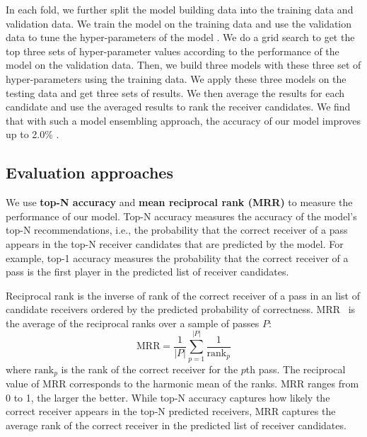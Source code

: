 In each fold, we further split the model building data into the training data and validation data.
We train the model on the training data and use the validation data to tune the hyper-parameters of the model .
We do a grid search to get the top three sets of hyper-parameter values according to the performance of the model on the validation data.
Then, we build three models with these three set of hyper-parameters using the training data. 
We apply these three models on the testing data and get three sets of results.
We then average the results for each candidate and use the averaged results to rank the receiver candidates. We find that with such a model ensembling approach, the accuracy of our model improves up to 2.0\% .




\subsection{Evaluation approaches}

We use \textbf{top-N accuracy} and \textbf{mean reciprocal rank (MRR)} to measure the performance of our model.
Top-N accuracy measures the accuracy of the model's top-N recommendations, i.e., the probability that the correct receiver of a pass appears in the top-N receiver candidates that are predicted by the model.
For example, top-1 accuracy measures the probability that the correct receiver of a pass is the first player in the predicted list of receiver candidates.

Reciprocal rank is the inverse of rank of the correct receiver of a pass in an list of candidate receivers ordered by the predicted probability of correctness.
MRR~\cite{Craswell2009} is the average of the reciprocal ranks over a sample of passes $P$:
\begin{equation}
  \textrm{MRR} = \frac{1}{|P|}\displaystyle\sum_{p=1}^{|P|}\frac{1}{\textrm{rank}_p}
\end{equation}
where $\textrm{rank}_p$ is the rank of the correct receiver for the $p$th pass.
The reciprocal value of MRR corresponds to the harmonic mean of the ranks.
MRR ranges from 0 to 1, the larger the better. 
While top-N accuracy captures how likely the correct receiver appears in the top-N predicted receivers, 
MRR captures the average rank of the correct receiver in the predicted list of receiver candidates.
 
